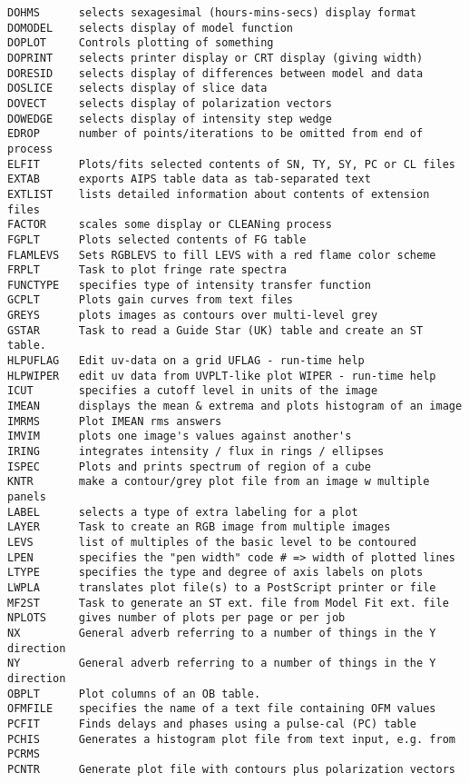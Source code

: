 \begin{verbatim}
DOHMS      selects sexagesimal (hours-mins-secs) display format
DOMODEL    selects display of model function
DOPLOT     Controls plotting of something
DOPRINT    selects printer display or CRT display (giving width)
DORESID    selects display of differences between model and data
DOSLICE    selects display of slice data
DOVECT     selects display of polarization vectors
DOWEDGE    selects display of intensity step wedge
EDROP      number of points/iterations to be omitted from end of process
ELFIT      Plots/fits selected contents of SN, TY, SY, PC or CL files
EXTAB      exports AIPS table data as tab-separated text
EXTLIST    lists detailed information about contents of extension files
FACTOR     scales some display or CLEANing process
FGPLT      Plots selected contents of FG table
FLAMLEVS   Sets RGBLEVS to fill LEVS with a red flame color scheme
FRPLT      Task to plot fringe rate spectra
FUNCTYPE   specifies type of intensity transfer function
GCPLT      Plots gain curves from text files
GREYS      plots images as contours over multi-level grey
GSTAR      Task to read a Guide Star (UK) table and create an ST table.
HLPUFLAG   Edit uv-data on a grid UFLAG - run-time help
HLPWIPER   edit uv data from UVPLT-like plot WIPER - run-time help
ICUT       specifies a cutoff level in units of the image
IMEAN      displays the mean & extrema and plots histogram of an image
IMRMS      Plot IMEAN rms answers
IMVIM      plots one image's values against another's
IRING      integrates intensity / flux in rings / ellipses
ISPEC      Plots and prints spectrum of region of a cube
KNTR       make a contour/grey plot file from an image w multiple panels
LABEL      selects a type of extra labeling for a plot
LAYER      Task to create an RGB image from multiple images
LEVS       list of multiples of the basic level to be contoured
LPEN       specifies the "pen width" code # => width of plotted lines
LTYPE      specifies the type and degree of axis labels on plots
LWPLA      translates plot file(s) to a PostScript printer or file
MF2ST      Task to generate an ST ext. file from Model Fit ext. file
NPLOTS     gives number of plots per page or per job
NX         General adverb referring to a number of things in the Y direction
NY         General adverb referring to a number of things in the Y direction
OBPLT      Plot columns of an OB table.
OFMFILE    specifies the name of a text file containing OFM values
PCFIT      Finds delays and phases using a pulse-cal (PC) table
PCHIS      Generates a histogram plot file from text input, e.g. from PCRMS
PCNTR      Generate plot file with contours plus polarization vectors

\end{verbatim}
